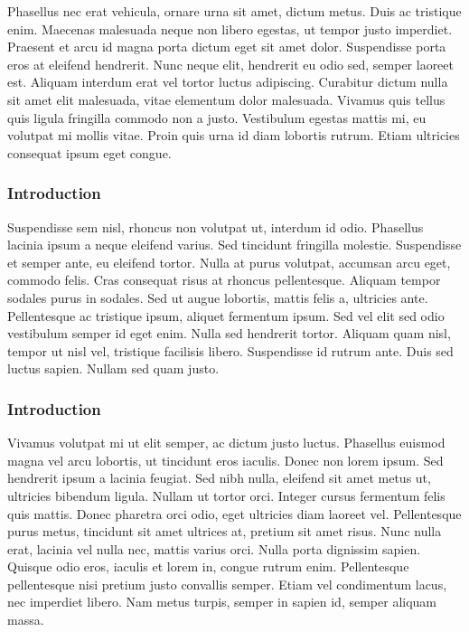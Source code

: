 Phasellus nec erat vehicula, ornare urna sit amet, dictum metus. Duis ac
tristique enim. Maecenas malesuada neque non libero egestas, ut tempor justo
imperdiet. Praesent et arcu id magna porta dictum eget sit amet dolor.
Suspendisse porta eros at eleifend hendrerit. Nunc neque elit, hendrerit eu
odio sed, semper laoreet est. Aliquam interdum erat vel tortor luctus
adipiscing. Curabitur dictum nulla sit amet elit malesuada, vitae elementum
dolor malesuada. Vivamus quis tellus quis ligula fringilla commodo non a justo.
Vestibulum egestas mattis mi, eu volutpat mi mollis vitae. Proin quis urna id
diam lobortis rutrum. Etiam ultricies consequat ipsum eget congue.

\subsubsection{Introduction}
Suspendisse sem nisl, rhoncus non volutpat ut, interdum id odio. Phasellus
lacinia ipsum a neque eleifend varius. Sed tincidunt fringilla molestie.
Suspendisse et semper ante, eu eleifend tortor. Nulla at purus volutpat,
accumsan arcu eget, commodo felis. Cras consequat risus at rhoncus
pellentesque. Aliquam tempor sodales purus in sodales. Sed ut augue lobortis,
mattis felis a, ultricies ante. Pellentesque ac tristique ipsum, aliquet
fermentum ipsum. Sed vel elit sed odio vestibulum semper id eget enim. Nulla
sed hendrerit tortor. Aliquam quam nisl, tempor ut nisl vel, tristique
facilisis libero. Suspendisse id rutrum ante. Duis sed luctus sapien. Nullam
sed quam justo.

\subsubsection{Introduction}
Vivamus volutpat mi ut elit semper, ac dictum justo luctus. Phasellus euismod
magna vel arcu lobortis, ut tincidunt eros iaculis. Donec non lorem ipsum. Sed
hendrerit ipsum a lacinia feugiat. Sed nibh nulla, eleifend sit amet metus ut,
ultricies bibendum ligula. Nullam ut tortor orci. Integer cursus fermentum
felis quis mattis. Donec pharetra orci odio, eget ultricies diam laoreet vel.
Pellentesque purus metus, tincidunt sit amet ultrices at, pretium sit amet
risus. Nunc nulla erat, lacinia vel nulla nec, mattis varius orci. Nulla porta
dignissim sapien. Quisque odio eros, iaculis et lorem in, congue rutrum enim.
Pellentesque pellentesque nisi pretium justo convallis semper. Etiam vel
condimentum lacus, nec imperdiet libero. Nam metus turpis, semper in sapien id,
semper aliquam massa.

